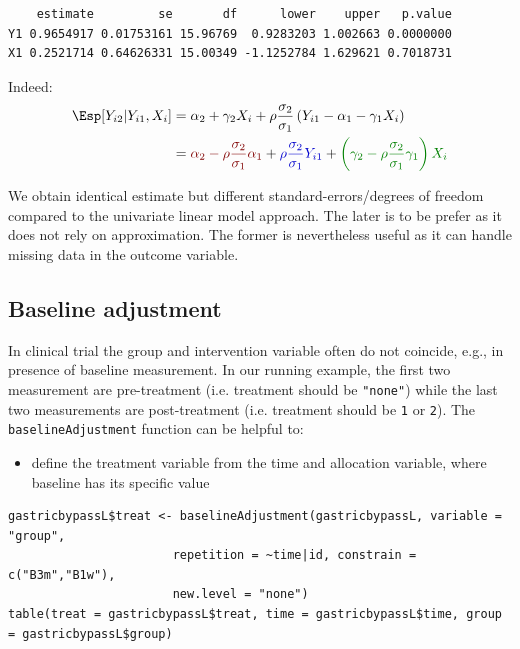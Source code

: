 \documentclass[12pt]{article}
\newcommand{\darkblue}{blue!80!black}
\newcommand{\darkgreen}{green!50!black}
\newcommand{\darkred}{red!50!black}
\begin{document}
\begin{verbatim}
    estimate         se       df      lower    upper   p.value
Y1 0.9654917 0.01753161 15.96769  0.9283203 1.002663 0.0000000
X1 0.2521714 0.64626331 15.00349 -1.1252784 1.629621 0.7018731
\end{verbatim}


Indeed:
\begin{align*}
\Esp[Y_{i2}|Y_{i1},X_{i}] &= \alpha_2 + \gamma_2 X_{i} + \rho \frac{\sigma_2}{\sigma_1}\left(Y_{i1} - \alpha_1 - \gamma_1 X_{i}\right) \\
                         &= \textcolor{\darkred}{\alpha_2 - \rho \frac{\sigma_2}{\sigma_1} \alpha_1}
                         + \textcolor{\darkblue}{\rho \frac{\sigma_2}{\sigma_1}Y_{i1}}
                         + \textcolor{\darkgreen}{\left(\gamma_2 - \rho \frac{\sigma_2}{\sigma_1} \gamma_1\right)  X_{i} }
\end{align*}

We obtain identical estimate but different standard-errors/degrees of
freedom compared to the univariate linear model approach. The later is
to be prefer as it does not rely on approximation. The former is
nevertheless useful as it can handle missing data in the outcome
variable.

\clearpage

\subsection{Baseline adjustment}
\label{sec:org1c7e8a3}

In clinical trial the group and intervention variable often do not
coincide, e.g., in presence of baseline measurement. In our running
example, the first two measurement are pre-treatment (i.e. treatment
should be \texttt{"none"}) while the last two measurements are post-treatment
(i.e. treatment should be \texttt{1} or \texttt{2}). The \texttt{baselineAdjustment}
function can be helpful to:
\begin{itemize}
\item define the treatment variable from the time and allocation variable, where baseline has its specific value
\end{itemize}
\lstset{language=r,label= ,caption= ,captionpos=b,numbers=none}
\begin{lstlisting}
gastricbypassL$treat <- baselineAdjustment(gastricbypassL, variable = "group",
					   repetition = ~time|id, constrain = c("B3m","B1w"),
					   new.level = "none")
table(treat = gastricbypassL$treat, time = gastricbypassL$time, group = gastricbypassL$group)
\end{lstlisting}
\end{document}
